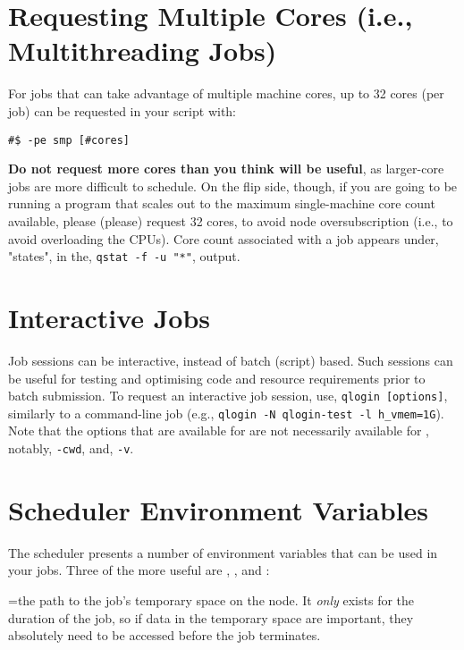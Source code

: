 \documentclass{easychair}
\begin{document}
\section{Requesting Multiple Cores (i.e., Multithreading Jobs)}

For jobs that can take advantage of multiple machine cores, up to 32 cores (per job) can be requested in your script with: 

\begin{verbatim}
#$ -pe smp [#cores] 
\end{verbatim}

\textbf{Do not request more cores than you think will be useful}, as larger-core jobs are more difficult to schedule. On the flip side, though, if you are going to be running a program that scales out to the maximum single-machine core count available, please (please) request 32 cores, to avoid node oversubscription (i.e., to avoid overloading the CPUs).  
Core count associated with a job appears under, "states", in the, \texttt{qstat -f -u "*"}, output.  

\section{Interactive Jobs}

Job sessions can be interactive, instead of batch (script) based. Such sessions can be  useful for testing and optimising code and resource requirements prior to batch submission. To request an interactive job session, use, \texttt{qlogin [options]}, similarly to a 
 command-line job (e.g., \texttt{qlogin -N qlogin-test -l h\_vmem=1G}). Note that the options that are available for  are not necessarily available for , notably, \texttt{-cwd}, and, \texttt{-v}. 

\section{Scheduler Environment Variables}

The scheduler presents a number of environment variables that can be used in your jobs. Three of the more useful are , , and :

=the path to the job's temporary space on the node. It \emph{only} exists for the duration of the job, so if data in the temporary space are important, they absolutely need to be accessed before the job terminates.  
\end{document}

